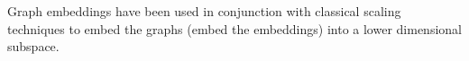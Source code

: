 \documentclass[11pt]{article}
\begin{document}
Graph embeddings have been used in conjunction with classical scaling techniques to embed the graphs (embed the embeddings) into a lower dimensional subspace.





\end{document}

